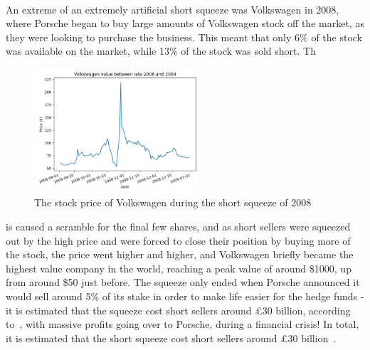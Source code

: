 \documentclass[11pt]{article} %
\begin{document}
\paragraph{}
An extreme of an extremely artificial short squeeze was Volkswagen in 2008, where 
Porsche began to buy large amounts of Volkswagen stock off the market, as they were looking 
to purchase the business. This 
meant that only 6\% of the stock was available on the market, while 13\% of the stock 
was sold short. Th\begin{figure}[h]
    \centering
    \includegraphics[width=0.55\textwidth]{volkswagenShortSqueeze.png}
    \caption{The stock price of Volkswagen during the short squeeze of 2008}
    \end{figure}is caused a scramble for the final few shares, and as short sellers 
were squeezed out by the high price and were forced to close their position by buying 
more of the stock, the price went higher and higher, and Volkswagen briefly became 
the highest value company in the world, reaching a peak value of around \$1000, up from 
around \$50 just before. The squeeze only ended when Porsche announced 
it would sell around 5\% of its stake in order to make life easier for the hedge 
funds - it is estimated that the squeeze cost short sellers around £30 billion, 
according to~\cite{volkswagen}, with massive profits going over to Porsche, during 
a financial crisis! In total, it is estimated that the short squeeze cost short 
sellers around £30 billion~\cite{volkswagen}. 
\end{document}
